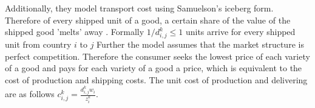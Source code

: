 Additionally, they model transport cost using Samuelson{'}s iceberg form. Therefore of every shipped unit of a good, a certain share of the value of the shipped good 'melts' away  \parencite[p.78]{combes}. Formally $1/d^k_{i,j} \leq 1$ units arrive for every shipped unit from country $i$ to $j$  %
Further the model assumes that the market structure is perfect competition. Therefore the consumer seeks the lowest price of each variety of a good and pays  for each variety of a good a price, which is equivalent to the cost of production and shipping costs. The unit cost of production and delivering are as follows $c^k_{i,j}=\frac{d^k_{i,j} w_i}{z_i^k}$.  \par 


